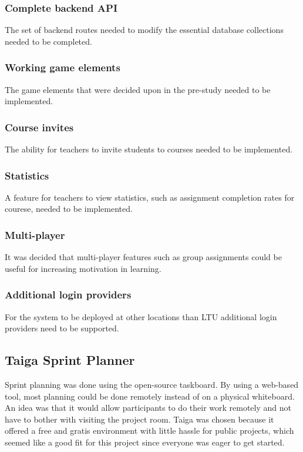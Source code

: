 \subsubsection{Complete backend API}
The set of backend routes needed to modify the essential database collections needed to be completed.

\subsubsection{Working game elements}
The game elements that were decided upon in the pre-study needed to be implemented.

\subsubsection{Course invites}
The ability for teachers to invite students to courses needed to be implemented.

\subsubsection{Statistics}
A feature for teachers to view statistics, such as assignment completion rates for courese, needed to be implemented.

\subsubsection{Multi-player}
It was decided that multi-player features such as group assignments could be useful for increasing motivation in learning.

\subsubsection{Additional login providers}
For the system to be deployed at other locations than LTU additional login providers need to be supported.

\subsection{Taiga Sprint Planner}
Sprint planning was done using the open-source \taiga{} taskboard. By using a web-based tool, most planning could be done remotely instead of on a physical whiteboard. An idea was that it would allow participants to do their work remotely and not have to bother with visiting the project room. Taiga was chosen because it offered a free and gratis environment with little hassle for public projects, which seemed like a good fit for this project since everyone was eager to get started.

